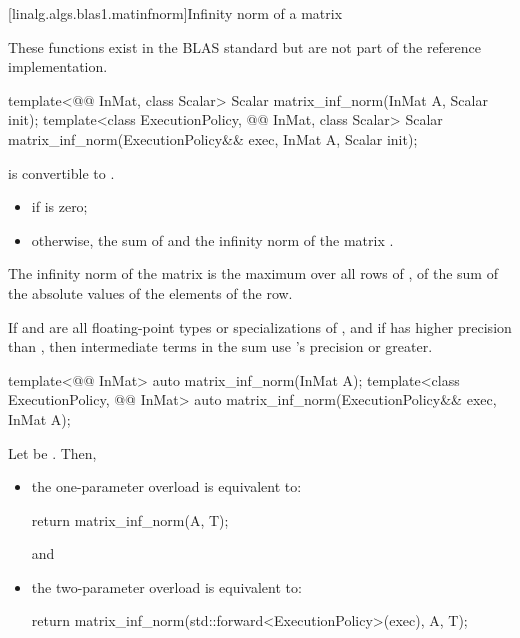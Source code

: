 [linalg.algs.blas1.matinfnorm]{Infinity norm of a matrix}

\pnum
\begin{note}
These functions exist in the BLAS standard\supercite{blas-std}
but are not part of the reference implementation.
\end{note}

%
\begin{itemdecl}
template<@@ InMat, class Scalar>
  Scalar matrix_inf_norm(InMat A, Scalar init);
template<class ExecutionPolicy, @@ InMat, class Scalar>
  Scalar matrix_inf_norm(ExecutionPolicy&& exec, InMat A, Scalar init);
\end{itemdecl}

\begin{itemdescr}
\pnum
\mandates
{}
is convertible to .

\pnum
\returns
\begin{itemize}
\item
{} if  is zero;
\item
otherwise,
the sum of  and the infinity norm of the matrix .
\end{itemize}
\begin{note}
The infinity norm of the matrix 
is the maximum over all rows of ,
of the sum of the absolute values
of the elements of the row.
\end{note}

\pnum
\remarks
If  and 
are all floating-point types or specializations of ,
and if  has higher precision
than ,
then intermediate terms in the sum use 's precision or greater.
\end{itemdescr}

%
\begin{itemdecl}
template<@@ InMat>
  auto matrix_inf_norm(InMat A);
template<class ExecutionPolicy, @@ InMat>
  auto matrix_inf_norm(ExecutionPolicy&& exec, InMat A);
\end{itemdecl}

\begin{itemdescr}

\pnum
\effects
Let  be
.
Then,
\begin{itemize}
\item
the one-parameter overload is equivalent to:
\begin{codeblock}
return matrix_inf_norm(A, T{});
\end{codeblock}
and
\item
the two-parameter overload is equivalent to:
\begin{codeblock}
return matrix_inf_norm(std::forward<ExecutionPolicy>(exec), A, T{});
\end{codeblock}
\end{itemize}
\end{itemdescr}

